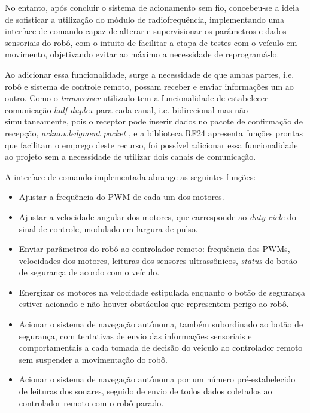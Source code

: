 No entanto, após concluir o sistema de acionamento sem fio, concebeu-se a ideia de sofisticar a utilização do módulo de radiofrequência, 
implementando uma interface de comando capaz de alterar e supervisionar os parâmetros e dados sensoriais do robô, com o intuito de facilitar a etapa 
de testes com o veículo em movimento, objetivando evitar ao máximo a necessidade de reprogramá-lo.

Ao adicionar essa funcionalidade, surge a necessidade de que ambas partes, i.e. robô e sistema de controle remoto, possam receber e enviar 
informações um ao outro.
Como o \textit{transceiver} utilizado tem a funcionalidade de estabelecer comunicação \textit{half-duplex} para cada canal, i.e. bidirecional mas não 
simultaneamente, pois o receptor pode inserir dados no pacote de confirmação de recepção, \textit{acknowledgment packet} \cite{nRF}, e a biblioteca 
RF24 apresenta funções prontas que facilitam o emprego deste recurso, foi possível adicionar essa funcionalidade ao projeto sem a necessidade de 
utilizar dois canais de comunicação.

A interface de comando implementada abrange as seguintes funções:
\begin{itemize}
 \item 
Ajustar a frequência do PWM de cada um dos motores.
 \item 
Ajustar a velocidade angular dos motores, que carresponde ao \textit{duty cicle} do sinal de controle, modulado em largura de pulso.
 \item 
 Enviar parâmetros do robô ao controlador remoto: frequência dos PWMs, velocidades dos motores, leituras dos sensores ultrassônicos, 
\textit{status} do botão de segurança de acordo com o veículo.
 \item 
Energizar os motores na velocidade estipulada enquanto o botão de segurança estiver acionado e não houver obstáculos que representem perigo ao robô.
 \item 
Acionar o sistema de navegação autônoma, também subordinado ao botão de segurança, com tentativas de envio das informações sensoriais e 
comportamentais a cada tomada de decisão do veículo ao controlador remoto sem suspender a movimentação do robô.
 \item 
 Acionar o sistema de navegação autônoma por um número pré-estabelecido de leituras dos sonares, seguido de envio de todos dados coletados ao 
controlador remoto com o robô parado.
\end{itemize}


